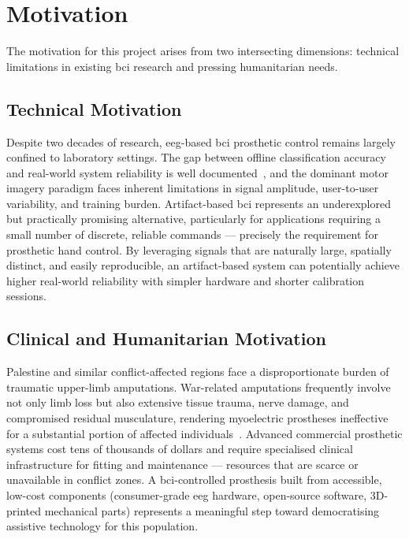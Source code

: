 \section{Motivation}
\label{sec:motivation}

The motivation for this project arises from two intersecting
dimensions: technical limitations in existing \acrshort{bci} research
and pressing humanitarian needs.

\subsection{Technical Motivation}

Despite two decades of research, \acrshort{eeg}-based \acrshort{bci}
prosthetic control remains largely confined to laboratory settings.
The gap between offline classification accuracy and real-world
system reliability is well documented~\cite{vidaurre2010bci}, and
the dominant motor imagery paradigm faces inherent limitations in
signal amplitude, user-to-user variability, and training burden.
Artifact-based \acrshort{bci} represents an underexplored but
practically promising alternative, particularly for applications
requiring a small number of discrete, reliable commands — precisely
the requirement for prosthetic hand control. By leveraging signals
that are naturally large, spatially distinct, and easily reproducible,
an artifact-based system can potentially achieve higher real-world
reliability with simpler hardware and shorter calibration sessions.

\subsection{Clinical and Humanitarian Motivation}

Palestine and similar conflict-affected regions face a disproportionate
burden of traumatic upper-limb amputations. War-related amputations
frequently involve not only limb loss but also extensive tissue trauma,
nerve damage, and compromised residual musculature, rendering
myoelectric prostheses ineffective for a substantial portion of
affected individuals~\cite{who2022assistive}. Advanced commercial
prosthetic systems cost tens of thousands of dollars and require
specialised clinical infrastructure for fitting and maintenance —
resources that are scarce or unavailable in conflict zones. A
\acrshort{bci}-controlled prosthesis built from accessible, low-cost
components (consumer-grade \acrshort{eeg} hardware, open-source
software, 3D-printed mechanical parts) represents a meaningful step
toward democratising assistive technology for this population.

